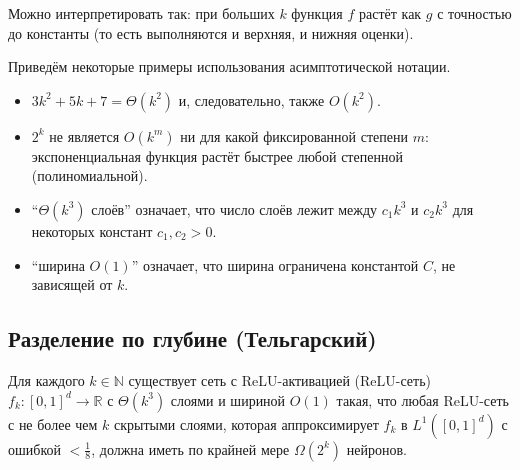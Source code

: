 \documentclass[../NDCNNAI_main.tex]{subfiles}
\begin{document}
\begin{remark}
Можно интерпретировать так: при больших $k$ функция $f$ растёт как $g$ с точностью до константы
(то есть выполняются и верхняя, и нижняя оценки).
\end{remark}

\begin{example}
  Приведём некоторые примеры использования асимптотической нотации.
  \begin{itemize}
  \item $3k^2+5k+7=\Theta(k^2)$ и, следовательно, также $O(k^2)$.
  \item $2^k$ не является $O(k^m)$ ни для какой фиксированной степени $m$:
  экспоненциальная функция растёт быстрее любой степенной (полиномиальной).
  \item ``$\Theta(k^3)$ слоёв'' означает, что число слоёв лежит между $c_1k^3$ и $c_2k^3$ для некоторых констант $c_1,c_2>0$.
  \item ``ширина $O(1)$'' означает, что ширина ограничена константой $C$, не зависящей от $k$.
\end{itemize}
\end{example}

\subsection{Разделение по глубине (Тельгарский)}

\begin{theorem}
Для каждого $k\in\mathbb{N}$ существует сеть с ReLU-активацией (ReLU-сеть) $f_k\colon [0,1]^d \to \mathbb{R}$ с $\Theta(k^3)$ слоями и шириной $O(1)$ такая, что любая ReLU-сеть с не более чем $k$ скрытыми слоями, которая аппроксимирует $f_k$ в $L^1([0,1]^d)$ с ошибкой $<\frac{1}{8}$, должна иметь по крайней мере $\Omega(2^k)$ нейронов.
\end{theorem}
\end{document}
